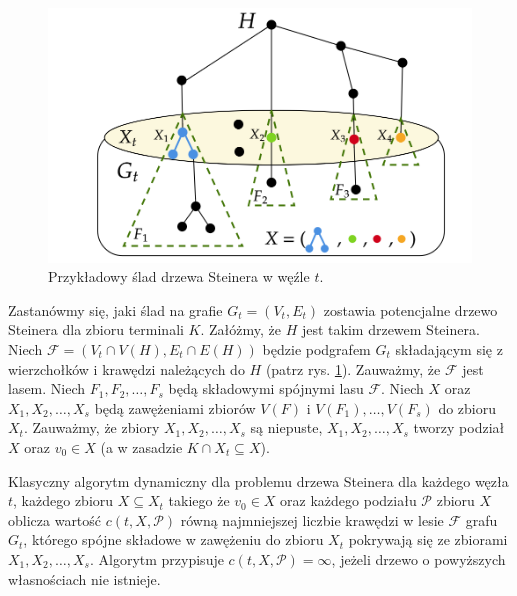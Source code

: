 \documentclass[12pt, oneside]{report}
\begin{document}
\begin{figure}
\centering
\includegraphics[width=16cm]{steiner_tree.png}
\caption{Przykładowy ślad drzewa Steinera w węźle $t$.}
\label{steiner_tree}
\end{figure}

Zastanówmy się, jaki ślad na grafie $G_t = (V_t, E_t)$ zostawia potencjalne drzewo Steinera dla zbioru terminali $K$. Załóżmy, że $H$ jest takim drzewem Steinera. Niech $\mathcal{F} = (V_t \cap V(H), E_t \cap E(H))$ będzie podgrafem $G_t$ składającym się z wierzchołków i krawędzi należących do $H$ (patrz rys. \ref{steiner_tree}). Zauważmy, że $\mathcal{F}$ jest lasem. Niech $F_1, F_2, \ldots, F_s$ będą składowymi spójnymi lasu $\mathcal{F}$. Niech $X$ oraz $X_1, X_2, \ldots, X_s$ będą zawężeniami zbiorów $V(F)$ i $V(F_1), \ldots, V(F_s)$ do zbioru $X_t$. Zauważmy, że zbiory $X_1, X_2, \ldots, X_s$ są niepuste, $X_1, X_2, \ldots, X_s$ tworzy podział $X$ oraz $v_0 \in X$ (a w zasadzie $K \cap X_t \subseteq X$).

Klasyczny algorytm dynamiczny dla problemu drzewa Steinera dla każdego węzła $t$, każdego zbioru $X \subseteq X_t$ takiego że $v_0 \in X$ oraz każdego podziału $\mathcal{P}$ zbioru $X$ oblicza wartość $c(t, X, \mathcal{P})$ równą najmniejszej liczbie krawędzi w lesie $\mathcal{F}$ grafu $G_t$, którego spójne składowe w zawężeniu do zbioru $X_t$ pokrywają się ze zbiorami $X_1, X_2, \ldots, X_s$. Algorytm przypisuje $c(t, X, \mathcal{P}) = \infty$, jeżeli drzewo o powyższych własnościach nie istnieje.
\end{document}
